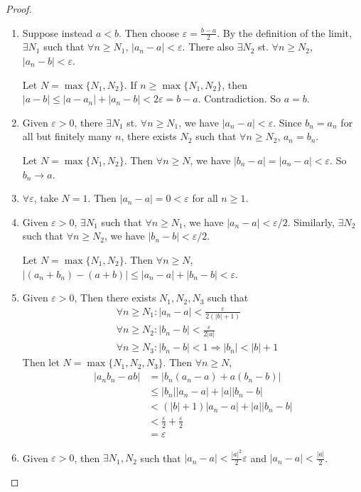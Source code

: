 \documentclass[a4paper]{article}
\begin{document}
\begin{proof}\leavevmode
  \begin{enumerate}
    \item Suppose instead $a < b$. Then choose $\varepsilon = \frac{b - a}{2}$. By the definition of the limit, $\exists N_1$ such that $\forall n\geq N_1$, $|a_n - a| < \varepsilon$. There also $\exists N_2$ st. $\forall n\geq N_2$, $|a_n - b| < \varepsilon$.

      Let $N = \max\{N_1, N_2\}$. If $n\geq \max\{N_1, N_2\}$, then $|a - b| \leq |a - a_n| + |a_n - b| < 2\varepsilon = b - a.$
      Contradiction. So $a = b$.
    \item Given $\varepsilon > 0$, there $\exists N_1$ st. $\forall n\geq N_1$, we have $|a_n - a| < \varepsilon$. Since $b_n = a_n$ for all but finitely many $n$, there exists $N_2$ such that $\forall n\geq N_2$, $a_n = b_n$.

      Let $N = \max\{N_1, N_2\}$. Then $\forall n\geq N$, we have $|b_n - a| = |a_n - a| < \varepsilon$. So $b_n\to a$.
    \item $\forall \varepsilon$, take $N = 1$. Then $|a_n - a| = 0 < \varepsilon$ for all $n \geq 1$.
    \item Given $\varepsilon > 0$, $\exists N_1$ such that $\forall n\geq N_1$, we have $|a_n - a| < \varepsilon/2$. Similarly, $\exists N_2$ such that $\forall n\geq N_2$, we have $|b_n - b| < \varepsilon/2$.

      Let $N = \max\{N_1, N_2\}$. Then $\forall n \geq N$, $|(a_n + b_n) - (a + b)| \leq |a_n - a| + |b_n - b| < \varepsilon$.
    \item Given $\varepsilon > 0$, Then there exists $N_1, N_2, N_3$ such that
      \begin{align*}
        &\forall n\geq N_1: |a_n - a| < \frac{\varepsilon}{2(|b| + 1)}\\
        &\forall n\geq N_2: |b_n - b| < \frac{\varepsilon}{2|a|}\\
        &\forall n\geq N_3: |b_n - b| < 1 \Rightarrow |b_n| < |b| +1
      \end{align*}
      Then let $N = \max\{N_1, N_2, N_3\}$. Then $\forall n\geq N$,
      \begin{align*}
        |a_nb_n - ab| &= |b_n(a_n - a) + a(b_n - b)|\\
        &\leq |b_n| |a_n - a| + |a||b_n - b|\\
        &< (|b| + 1) |a_n - a| + |a||b_n - b|\\
        &< \frac{\varepsilon}{2} + \frac{\varepsilon}{2}\\
        &= \varepsilon
      \end{align*}
    \item Given $\varepsilon > 0$, then $\exists N_1, N_2$ such that $|a_n - a| < \frac{|a|^2}{2}\varepsilon$ and $|a_n - a| < \frac{|a|}{2}$.


\end{enumerate}
\end{proof}
\end{document}
